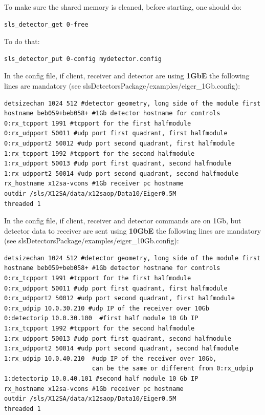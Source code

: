 \documentclass{article}
\begin{document}
To make sure the shared memory is cleaned, before starting, one should do:  
\begin{verbatim}
sls_detector_get 0-free
\end{verbatim}
To do that:
\begin{verbatim}
sls_detector_put 0-config mydetector.config
\end{verbatim}

In the config file, if client, receiver and detector are using \textbf{1GbE} the following lines are mandatory (see slsDetectorsPackage/examples/eiger\_1Gb.config):
\begin{verbatim}
detsizechan 1024 512 #detector geometry, long side of the module first
hostname beb059+beb058+ #1Gb detector hostname for controls
0:rx_tcpport 1991 #tcpport for the first halfmodule                 
0:rx_udpport 50011 #udp port first quadrant, first halfmodule         
0:rx_udpport2 50012 #udp port second quadrant, first halfmodule       
1:rx_tcpport 1992 #tcpport for the second halfmodule               
1:rx_udpport 50013 #udp port first quadrant, second halfmodule       
1:rx_udpport2 50014 #udp port second quadrant, second halfmodule      
rx_hostname x12sa-vcons #1Gb receiver pc hostname
outdir /sls/X12SA/data/x12saop/Data10/Eiger0.5M
threaded 1
\end{verbatim}

In the config file, if client, receiver and detector commands are on 1Gb, but detector data to receiver are sent using \textbf{10GbE} the following lines are mandatory (see slsDetectorsPackage/examples/eiger\_10Gb.config):
\begin{verbatim}
detsizechan 1024 512 #detector geometry, long side of the module first
hostname beb059+beb058+ #1Gb detector hostname for controls
0:rx_tcpport 1991 #tcpport for the first halfmodule                 
0:rx_udpport 50011 #udp port first quadrant, first halfmodule       
0:rx_udpport2 50012 #udp port second quadrant, first halfmodule       
0:rx_udpip 10.0.30.210 #udp IP of the receiver over 10Gb              
0:detectorip 10.0.30.100  #first half module 10 Gb IP 
1:rx_tcpport 1992 #tcpport for the second halfmodule                  
1:rx_udpport 50013 #udp port first quadrant, second halfmodule     
1:rx_udpport2 50014 #udp port second quadrant, second halfmodule  
1:rx_udpip 10.0.40.210  #udp IP of the receiver over 10Gb, 
                        can be the same or different from 0:rx_udpip                                   
1:detectorip 10.0.40.101 #second half module 10 Gb IP 
rx_hostname x12sa-vcons #1Gb receiver pc hostname
outdir /sls/X12SA/data/x12saop/Data10/Eiger0.5M
threaded 1
\end{verbatim}
\end{document}
